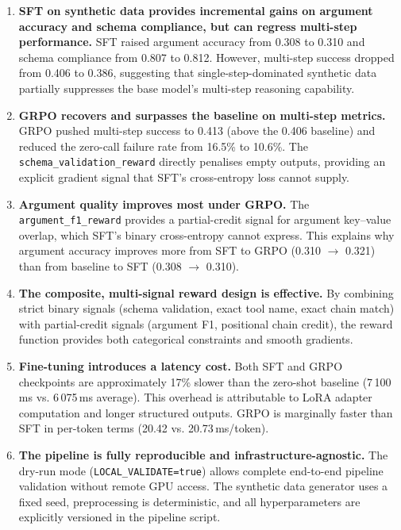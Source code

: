 \documentclass[12pt, a4paper]{article}
\begin{document}
\begin{enumerate}[leftmargin=1.5em, itemsep=10pt]

  \item \textbf{SFT on synthetic data provides incremental gains on argument
    accuracy and schema compliance, but can regress multi-step performance.}
    SFT raised argument accuracy from 0.308 to 0.310 and schema compliance
    from 0.807 to 0.812. However, multi-step success dropped from 0.406 to
    0.386, suggesting that single-step-dominated synthetic data partially
    suppresses the base model's multi-step reasoning capability.

  \item \textbf{GRPO recovers and surpasses the baseline on multi-step metrics.}
    GRPO pushed multi-step success to 0.413 (above the 0.406 baseline) and
    reduced the zero-call failure rate from 16.5\% to 10.6\%. The
    \texttt{schema\_validation\_reward} directly penalises empty outputs,
    providing an explicit gradient signal that SFT's cross-entropy loss cannot
    supply.

  \item \textbf{Argument quality improves most under GRPO.}
    The \texttt{argument\_f1\_reward} provides a partial-credit signal for
    argument key--value overlap, which SFT's binary cross-entropy cannot
    express. This explains why argument accuracy improves more from SFT to GRPO
    (0.310 $\rightarrow$ 0.321) than from baseline to SFT (0.308 $\rightarrow$
    0.310).

  \item \textbf{The composite, multi-signal reward design is effective.}
    By combining strict binary signals (schema validation, exact tool name,
    exact chain match) with partial-credit signals (argument F1, positional
    chain credit), the reward function provides both categorical constraints
    and smooth gradients.

  \item \textbf{Fine-tuning introduces a latency cost.}
    Both SFT and GRPO checkpoints are approximately 17\% slower than the
    zero-shot baseline (7\,100\,ms vs. 6\,075\,ms average). This overhead
    is attributable to LoRA adapter computation and longer structured outputs.
    GRPO is marginally faster than SFT in per-token terms (20.42 vs.
    20.73\,ms/token).

  \item \textbf{The pipeline is fully reproducible and infrastructure-agnostic.}
    The dry-run mode (\texttt{LOCAL\_VALIDATE=true}) allows complete
    end-to-end pipeline validation without remote GPU access. The
    synthetic data generator uses a fixed seed, preprocessing is deterministic,
    and all hyperparameters are explicitly versioned in the pipeline script.

\end{enumerate}
\end{document}
